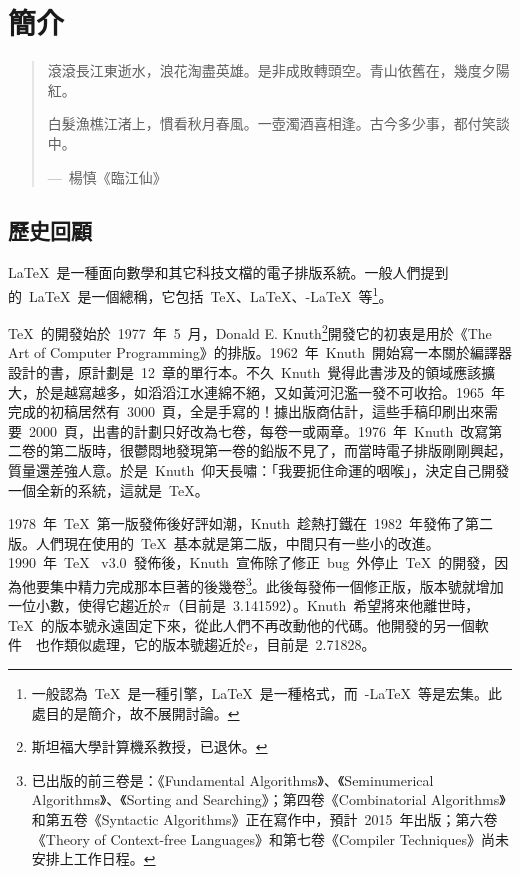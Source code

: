 \chapter{簡介}

\begin{quotation}
滾滾長江東逝水，浪花淘盡英雄。是非成敗轉頭空。青山依舊在，幾度夕陽紅。

白髮漁樵江渚上，慣看秋月春風。一壺濁酒喜相逢。古今多少事，都付笑談中。
\begin{flushright}
---~楊慎《臨江仙》
\end{flushright}
\end{quotation}

\section{歷史回顧}

\LaTeX~是一種面向數學和其它科技文檔的電子排版系統。一般人們提到的~\LaTeX~是一個總稱，它包括~\TeX、\LaTeX、\AmS-\LaTeX~等\footnote{一般認為~\TeX~是一種引擎，\LaTeX~是一種格式，而~\AmS-\LaTeX~等是宏集。此處目的是簡介，故不展開討論。}。

\TeX~的開發始於~1977~年~5~月，Donald E. Knuth\footnote{斯坦福大學計算機系教授，已退休。}開發它的初衷是用於《The Art of Computer Programming》的排版。1962~年~Knuth~開始寫一本關於編譯器設計的書，原計劃是~12~章的單行本。不久~Knuth~覺得此書涉及的領域應該擴大，於是越寫越多，如滔滔江水連綿不絕，又如黃河氾濫一發不可收拾。1965~年完成的初稿居然有~3000~頁，全是手寫的！據出版商估計，這些手稿印刷出來需要~2000~頁，出書的計劃只好改為七卷，每卷一或兩章。1976~年~Knuth~改寫第二卷的第二版時，很鬱悶地發現第一卷的鉛版不見了，而當時電子排版剛剛興起，質量還差強人意。於是~Knuth~仰天長嘯：「我要扼住命運的咽喉」，決定自己開發一個全新的系統，這就是~\TeX。

1978~年~\TeX~第一版發佈後好評如潮，Knuth~趁熱打鐵在~1982~年發佈了第二版。人們現在使用的~\TeX~基本就是第二版，中間只有一些小的改進。1990~年~\TeX~ v3.0~發佈後，Knuth~宣佈除了修正~bug~外停止~\TeX~的開發，因為他要集中精力完成那本巨著的後幾卷\footnote{已出版的前三卷是：《Fundamental Algorithms》、《Seminumerical Algorithms》、《Sorting and Searching》；第四卷《Combinatorial Algorithms》和第五卷《Syntactic Algorithms》正在寫作中，預計~2015~年出版；第六卷《Theory of Context-free Languages》和第七卷《Compiler Techniques》尚未安排上工作日程。}。此後每發佈一個修正版，版本號就增加一位小數，使得它趨近於$\pi$（目前是~3.141592）。Knuth~希望將來他離世時，\TeX~的版本號永遠固定下來，從此人們不再改動他的代碼。他開發的另一個軟件~\MF~也作類似處理，它的版本號趨近於$e$，目前是~2.71828。

